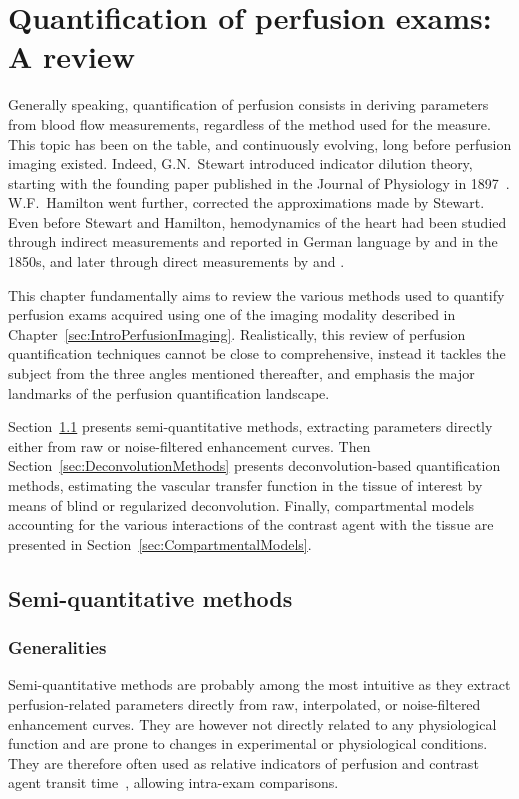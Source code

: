 \chapter{Quantification of perfusion exams: A review}\label{chapter:review}

Generally speaking, quantification of perfusion consists in deriving parameters from blood flow measurements, regardless of the method used for the measure. 
This topic has been on the table, and continuously evolving, long before perfusion imaging existed. 
Indeed, G.N.~Stewart introduced indicator dilution theory, starting with the founding paper published in the Journal of Physiology in 1897~\cite{Stewart:1897dz}. 
W.F.~Hamilton went further, corrected the approximations made by Stewart.
Even before Stewart and Hamilton, hemodynamics of the heart had been studied  through indirect measurements and reported in German language by \citet{Volkmann:1850us} and \citet{Vierordt:82xUDMVI} in the 1850s, and later through direct measurements by \citet{Stolnikow:1886wm} and \citet{Tigerstedt:1891wn}.

This chapter fundamentally aims to review the various methods used to quantify perfusion exams acquired using one of the imaging modality described in Chapter~\ref{sec:IntroPerfusionImaging}. 
Realistically, this review of perfusion quantification techniques cannot be close to comprehensive, instead it tackles the subject from the three angles mentioned thereafter, and emphasis the major landmarks of the perfusion quantification landscape.

Section~\ref{sec:SQMethods} presents semi-quantitative methods, extracting parameters directly either from raw or noise-filtered enhancement curves. 
Then Section~\ref{sec:DeconvolutionMethods} presents deconvolution-based quantification methods, estimating the vascular transfer function in the tissue of interest by means of blind or regularized deconvolution.
Finally, compartmental models accounting for the various interactions of the contrast agent with the tissue are presented in Section~\ref{sec:CompartmentalModels}. 

\section{Semi-quantitative methods}
\label{sec:SQMethods}
\subsection{Generalities}
Semi-quantitative methods are probably among the most intuitive as they extract perfusion-related parameters directly from raw, interpolated, or noise-filtered enhancement curves.
They are however not directly related to any physiological function and are prone to changes in experimental or physiological conditions.
They are therefore often used as relative indicators of perfusion and contrast agent transit time~\cite{Miles:1991et}, allowing intra-exam comparisons.

